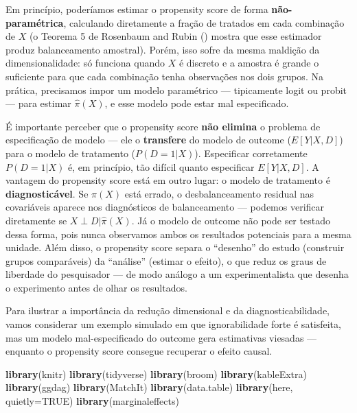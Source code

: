 \documentclass[
]{article}
\newenvironment{Shaded}{\begin{snugshade}}{\end{snugshade}}
\newcommand{\AttributeTok}[1]{\textcolor[rgb]{0.13,0.29,0.53}{#1}}
\newcommand{\ConstantTok}[1]{\textcolor[rgb]{0.56,0.35,0.01}{#1}}
\newcommand{\FunctionTok}[1]{\textcolor[rgb]{0.13,0.29,0.53}{\textbf{#1}}}
\newcommand{\NormalTok}[1]{#1}
\begin{document}
Em princípio, poderíamos estimar o propensity score de forma \textbf{não-paramétrica}, calculando diretamente a fração de tratados em cada combinação de \(X\) (o Teorema 5 de Rosenbaum and Rubin () mostra que esse estimador produz balanceamento amostral). Porém, isso sofre da mesma maldição da dimensionalidade: só funciona quando \(X\) é discreto e a amostra é grande o suficiente para que cada combinação tenha observações nos dois grupos. Na prática, precisamos impor um modelo paramétrico --- tipicamente logit ou probit --- para estimar \(\hat{\pi}(X)\), e esse modelo pode estar mal especificado.

É importante perceber que o propensity score \textbf{não elimina} o problema de especificação de modelo --- ele o \textbf{transfere} do modelo de outcome (\(E[Y|X,D]\)) para o modelo de tratamento (\(P(D=1|X)\)). Especificar corretamente \(P(D=1|X)\) é, em princípio, tão difícil quanto especificar \(E[Y|X,D]\). A vantagem do propensity score está em outro lugar: o modelo de tratamento é \textbf{diagnosticável}. Se \(\hat{\pi}(X)\) está errado, o desbalanceamento residual nas covariáveis aparece nos diagnósticos de balanceamento --- podemos verificar diretamente se \(X \perp D | \hat{\pi}(X)\). Já o modelo de outcome não pode ser testado dessa forma, pois nunca observamos ambos os resultados potenciais para a mesma unidade. Além disso, o propensity score separa o ``desenho'' do estudo (construir grupos comparáveis) da ``análise'' (estimar o efeito), o que reduz os graus de liberdade do pesquisador --- de modo análogo a um experimentalista que desenha o experimento antes de olhar os resultados.

Para ilustrar a importância da redução dimensional e da diagnosticabilidade, vamos considerar um exemplo simulado em que ignorabilidade forte é satisfeita, mas um modelo mal-especificado do outcome gera estimativas viesadas --- enquanto o propensity score consegue recuperar o efeito causal.

\begin{Shaded}
\begin{Highlighting}[]
\FunctionTok{library}\NormalTok{(knitr)}
\FunctionTok{library}\NormalTok{(tidyverse)}
\FunctionTok{library}\NormalTok{(broom)}
\FunctionTok{library}\NormalTok{(kableExtra)}
\FunctionTok{library}\NormalTok{(ggdag)}
\FunctionTok{library}\NormalTok{(MatchIt)}
\FunctionTok{library}\NormalTok{(data.table)}
\FunctionTok{library}\NormalTok{(here, }\AttributeTok{quietly=}\ConstantTok{TRUE}\NormalTok{)}
\FunctionTok{library}\NormalTok{(marginaleffects)}
\end{Highlighting}
\end{Shaded}
\end{document}
